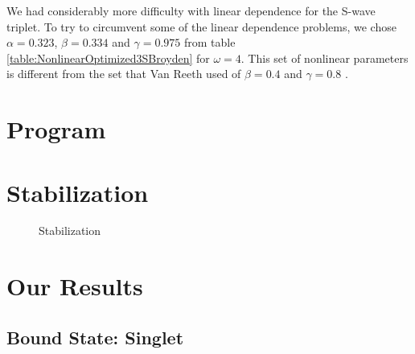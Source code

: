 \documentclass[Dissertation.tex]{subfiles}
\begin{document}
We had considerably more difficulty with linear dependence for the S-wave triplet.  To try to circumvent some of the linear dependence problems, we chose $\alpha = 0.323$, $\beta = 0.334$ and $\gamma = 0.975$ from table \ref{table:NonlinearOptimized3SBroyden} for $\omega = 4$.  This set of nonlinear parameters is different from the set that Van Reeth used of $\beta = 0.4$ and $\gamma = 0.8$ \cite{VanReeth2003}.




\section{Program}



\section{Stabilization}
\begin{figure}[ht]
	\centering
	\caption{Stabilization}
	\label{fig:Stabilization}
\end{figure}



\section{Our Results}
\subsection{Bound State: Singlet}
\end{document}
